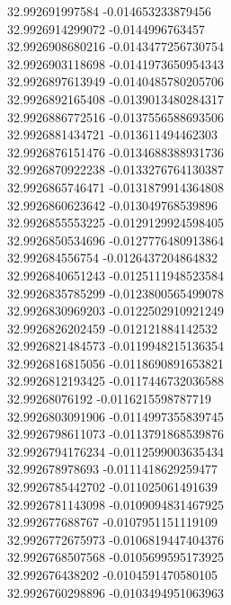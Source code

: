 {32.992691997584	-0.014653233879456\\
32.9926914299072	-0.0144996763457\\
32.9926908680216	-0.0143477256730754\\
32.9926903118698	-0.0141973650954343\\
32.9926897613949	-0.0140485780205706\\
32.9926892165408	-0.0139013480284317\\
32.9926886772516	-0.0137556588693506\\
32.9926881434721	-0.013611494462303\\
32.9926876151476	-0.0134688388931736\\
32.9926870922238	-0.0133276764130387\\
32.9926865746471	-0.0131879914364808\\
32.9926860623642	-0.013049768539896\\
32.9926855553225	-0.0129129924598405\\
32.9926850534696	-0.0127776480913864\\
32.992684556754	-0.0126437204864832\\
32.9926840651243	-0.0125111948523584\\
32.9926835785299	-0.0123800565499078\\
32.9926830969203	-0.0122502910921249\\
32.9926826202459	-0.012121884142532\\
32.9926821484573	-0.0119948215136354\\
32.9926816815056	-0.0118690891653821\\
32.9926812193425	-0.0117446732036588\\
32.99268076192	-0.0116215598787719\\
32.9926803091906	-0.0114997355839745\\
32.9926798611073	-0.0113791868539876\\
32.9926794176234	-0.0112599003635434\\
32.992678978693	-0.0111418629259477\\
32.9926785442702	-0.011025061491639\\
32.9926781143098	-0.0109094831467925\\
32.992677688767	-0.0107951151119109\\
32.9926772675973	-0.0106819447404376\\
32.9926768507568	-0.0105699595173925\\
32.992676438202	-0.0104591470580105\\
32.9926760298896	-0.0103494951063963\\
}
